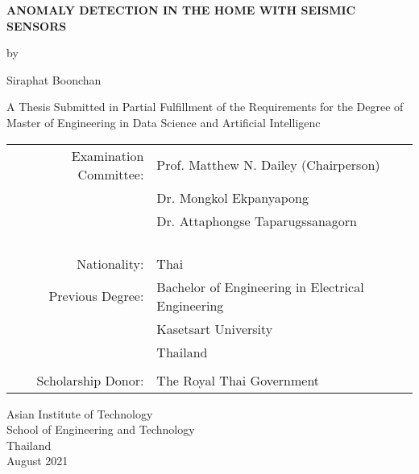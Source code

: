 \begin{titlepage}
  \begin{center}
  \setlength{\baselineskip}{1.6em}

  \textbf{\large{
    ANOMALY DETECTION IN THE HOME  WITH SEISMIC SENSORS
  }}

  \vspace{3em} %
  
  by
  
  \vspace{3em} %
  
  Siraphat Boonchan
  
  \vspace{4em} %

  A Thesis Submitted in Partial Fulfillment of the Requirements for the Degree of Master of Engineering in Data Science and Artificial Intelligenc

  \vspace{4em} %

\begin{center}
  \begin{tabular}{ rl }
Examination Committee: & Prof. Matthew N. Dailey (Chairperson) \\
                       & Dr. Mongkol Ekpanyapong \\ 
                       & Dr. Attaphongse Taparugssanagorn \\\\
                       
\\ \\ \\
Nationality:     & Thai \\ 
Previous Degree: & Bachelor of Engineering in Electrical Engineering \\
                 & Kasetsart University \\
                 & Thailand \\
\\
Scholarship Donor: & The Royal Thai Government
  \end{tabular}
\end{center}

\vspace{4em}

Asian Institute of Technology \\
School of Engineering and Technology \\
Thailand \\ 
August 2021


  \end{center}
\end{titlepage}
